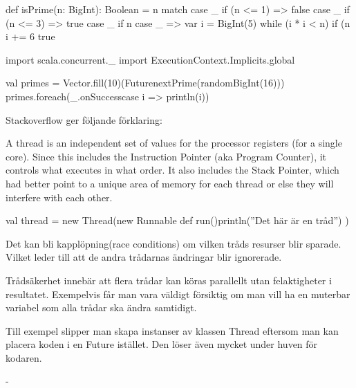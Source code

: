 \ExtraTasks %

\Task  %

\begin{Code}
def isPrime(n: BigInt): Boolean = n match {
  case _ if (n <= 1) => false
  case _ if (n <= 3) => true
  case _ if n %
  case _ => 
    var i = BigInt(5)
    while (i * i < n) {
      if (n %
      i += 6
    }
    true
}

import scala.concurrent._
import ExecutionContext.Implicits.global

val primes = Vector.fill(10)(Future{nextPrime(randomBigInt(16))})
primes.foreach(_.onSuccess{case i => println(i)})
\end{Code}

\Task %

\Subtask Stackoverflow ger följande förklaring: 

A thread is an independent set of values for the processor registers (for a single core). Since this includes the Instruction Pointer (aka Program Counter), it controls what executes in what order. It also includes the Stack Pointer, which had better point to a unique area of memory for each thread or else they will interfere with each other.

\Subtask

\begin{Code}
val thread = new Thread(new Runnable{
	def run(){println(''Det här är en tråd'')}
})
\end{Code}

\Subtask {}

\Subtask Det kan bli kapplöpning(race conditions) om vilken tråds resurser blir sparade. Vilket leder till att de andra trådarnas ändringar blir ignorerade.

\Subtask Trådsäkerhet innebär att flera trådar kan köras parallellt utan felaktigheter i resultatet. Exempelvis får man vara väldigt försiktig om man vill ha en muterbar variabel som alla trådar ska ändra samtidigt.

\Subtask Till exempel slipper man skapa instanser av klassen Thread eftersom man kan placera koden i en Future istället. Den löser även mycket under huven för kodaren.

\Task %

-

\AdvancedTasks %

\Task %

